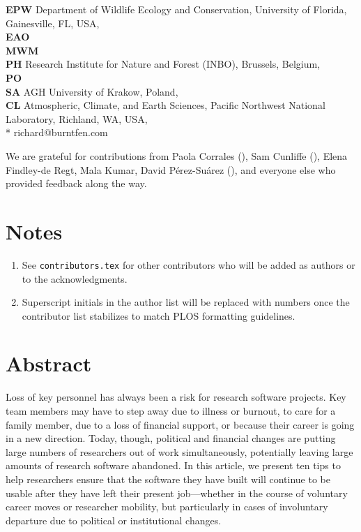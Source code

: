 \documentclass[10pt,letterpaper]{article}
\begin{document}
\begin{flushleft}
\textbf{EPW} Department of Wildlife Ecology and Conservation, University of Florida, Gainesville, FL, USA, \\
\textbf{EAO} \\
\textbf{MWM} \\
\textbf{PH} Research Institute for Nature and Forest (INBO), Brussels, Belgium, \\
\textbf{PO} \\
\textbf{SA} AGH University of Krakow, Poland, \\
\textbf{CL} Atmospheric, Climate, and Earth Sciences, Pacific Northwest National Laboratory, Richland, WA, USA, \\
* richard@burntfen.com
\end{flushleft}

\noindent
We are grateful for contributions from
Paola Corrales (),
Sam Cunliffe (),
Elena Findley-de Regt,
Mala Kumar,
David Pérez-Suárez (),
and everyone else who provided feedback along the way.

\section*{Notes}

\begin{enumerate}
\item
  See \texttt{contributors.tex} for other contributors who will be added as authors or to the acknowledgments.
\item
  Superscript initials in the author list will be replaced with numbers once the contributor list stabilizes to match PLOS formatting guidelines.
\end{enumerate}

\section*{Abstract}

Loss of key personnel has always been a risk for research software projects.
Key team members may have to step away due to illness or burnout,
to care for a family member, due to a loss of financial support, or because their career is going in a new direction.
Today, though, political and financial changes are putting large numbers of researchers out of work simultaneously,
potentially leaving large amounts of research software abandoned.
In this article, we present ten tips to help researchers ensure that the software they have built will continue to be usable after they have left their present job---whether in the course of voluntary career moves or researcher mobility, but particularly in cases of involuntary departure due to political or institutional changes.
\end{document}
